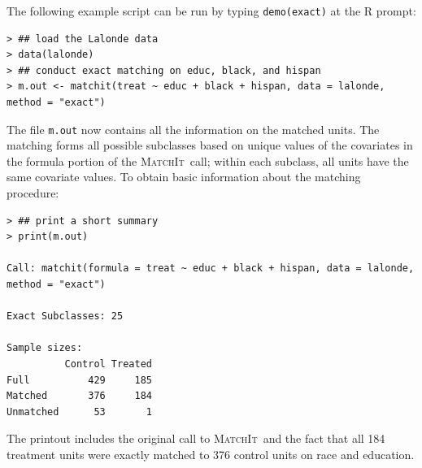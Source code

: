 \documentclass[oneside,letterpaper,titlepage]{article}
\newcommand{\MatchIt}{\textsc{MatchIt}}
\begin{document}
The following example script can be run by typing {\tt demo(exact)} at
the R prompt:
\begin{verbatim}
> ## load the Lalonde data
> data(lalonde)
> ## conduct exact matching on educ, black, and hispan
> m.out <- matchit(treat ~ educ + black + hispan, data = lalonde, method = "exact")
\end{verbatim}
The file \texttt{m.out} now contains all the information on the
matched units.  The matching forms all possible subclasses based on
unique values of the covariates in the formula portion of the
\MatchIt\ call; within each subclass, all units have the same
covariate values.  To obtain basic information about the matching
procedure:
\begin{verbatim}
> ## print a short summary
> print(m.out)

Call: matchit(formula = treat ~ educ + black + hispan, data = lalonde,     method = "exact")

Exact Subclasses: 25

Sample sizes:
          Control Treated
Full          429     185
Matched       376     184
Unmatched      53       1
\end{verbatim}
The printout includes the original call to \MatchIt\ and the fact that
all 184 treatment units were exactly matched to 376 control units on
race and education.  
\end{document}

